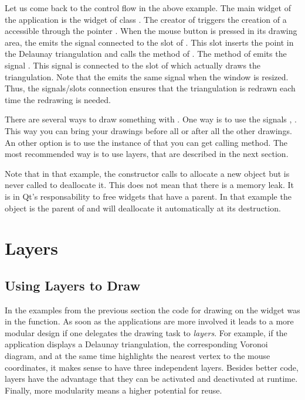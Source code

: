 Let us come back to the control flow in the above example.
The main widget of the application is the widget 
of  class .  The creator  of 
 triggers the creation of a 
accessible through the pointer .
When  the mouse button is pressed in its drawing area,
the  
emits the signal  
connected to the slot  of .
This slot inserts the point in the Delaunay triangulation
and calls the method  of .
The   method of 
emits the signal . This signal is
connected to the slot 
of   which actually draws the triangulation.
Note that the    emits the same signal
 when the window is resized. Thus,
the signals/slots connection  ensures that the
triangulation is redrawn  each time the redrawing is needed.


\begin{ccAdvanced}
There are several ways to draw something with . One way
is to use the signals , .
This way you can bring your drawings before all or after all the
other drawings. An other option is to use the  instance 
of  that you can get calling 
method. The most recommended way is to use layers, that are described
in the next section.
\end{ccAdvanced}

Note that in that example, the  constructor calls
 to allocate a new  object but  is
never called to deallocate it. This does not mean that there is a
memory leak. It is in Qt's responsability to free widgets that have a
parent. In that example the  object is the parent of
 and will deallocate it automatically at its destruction.

\section{Layers}
\label{Qt_widget_layers}
\subsection{Using Layers to Draw}

In the examples from the previous section the code for drawing on the
widget was in the  function. As soon as the
applications are more involved it leads to a more modular design if
one delegates the drawing task to {\em layers}. For example, if the
application displays a Delaunay triangulation, the corresponding
Voronoi diagram, and at the same time highlights the nearest vertex to
the mouse coordinates, it makes sense to have three independent
layers. Besides better code, layers have the advantage that they can
be activated and deactivated at runtime. Finally, more modularity
means a higher potential for reuse.

